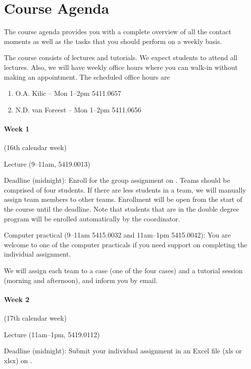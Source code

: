\documentclass{article}
\begin{document}
\section{Course Agenda}
\label{sec:agenda}

The course agenda provides you with a complete overview of all the contact moments as well as the tasks that you should perform on a weekly basis. 

The course consists of lectures and tutorials. We expect students to attend all lectures. Also, we will have weekly office hours where you can walk-in without making an appointment. The scheduled office hours are 
\begin{enumerate}
\item O.A. Kilic -- Mon 1--2pm 5411.0657
\item N.D. van Foreest -- Mon 1--2pm 5411.0656
\end{enumerate}

\paragraph{Week 1} {\footnotesize (16th calendar week)}
\begin{description}[font=\normalfont\itshape,leftmargin=!,labelwidth=2cm]
\item[Tue 18/4] Lecture (9--11am, 5419.0013)
\item[Thu 20/4] Deadline (midnight): Enroll for the group assignment on \nestor. Teams should be comprised of four students. If there are less students in a team, we will manually assign team members to other teams. Enrollment will be open from the start of the course until the deadline. Note that students that are in the double degree program will be enrolled automatically by the coordinator. 
\item[Fri 21/04] Computer practical (9--11am 5415.0032 and 11am--1pm 5415.0042): You are welcome to one of the computer practicals if you need support on completing the individual assignment.
\item[Fri 21/04] We will assign each team to a case (one of the four cases) and a tutorial session (morning and afternoon), and inform you by email.
\end{description}

\paragraph{Week 2} {\footnotesize (17th calendar week)}
\begin{description}[font=\normalfont\itshape,leftmargin=!,labelwidth=2cm]
\item[Mon 24/4] Lecture (11am--1pm, 5419.0112)
\item[Wed 26/4] Deadline (midnight): Submit your individual assignment in an Excel file (xls or xlsx) on \nestor. 
\end{description}
\end{document}
